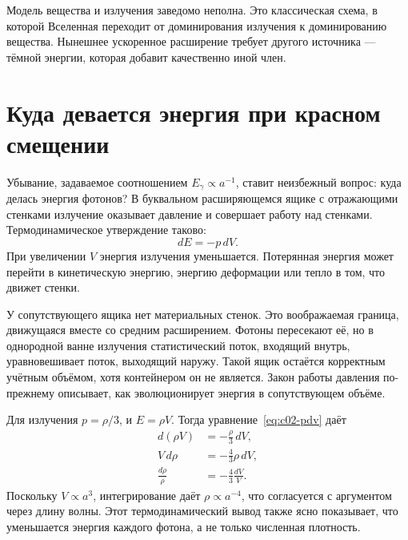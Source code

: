 Модель вещества и излучения заведомо неполна. Это классическая схема, в которой Вселенная переходит от доминирования излучения к доминированию вещества. Нынешнее ускоренное расширение требует другого источника — тёмной энергии, которая добавит качественно иной член.

\section{Куда девается энергия при красном смещении}

Убывание, задаваемое соотношением \(E_\gamma\propto a^{-1}\), ставит неизбежный вопрос: куда делась энергия фотонов? В буквальном расширяющемся ящике с отражающими стенками излучение оказывает давление и совершает работу над стенками. Термодинамическое утверждение таково:
\begin{equation}
dE=-p\,dV.
\label{eq:c02-pdv}
\end{equation}
При увеличении \(V\) энергия излучения уменьшается. Потерянная энергия может перейти в кинетическую энергию, энергию деформации или тепло в том, что движет стенки.

У сопутствующего ящика нет материальных стенок. Это воображаемая граница, движущаяся вместе со средним расширением. Фотоны пересекают её, но в однородной ванне излучения статистический поток, входящий внутрь, уравновешивает поток, выходящий наружу. Такой ящик остаётся корректным учётным объёмом, хотя контейнером он не является. Закон работы давления по-прежнему описывает, как эволюционирует энергия в сопутствующем объёме.

Для излучения \(p=\rho/3\), и \(E=\rho V\). Тогда уравнение~\eqref{eq:c02-pdv} даёт
\begin{align}
d(\rho V)&=-\frac{\rho}{3}\,dV,\\
V\,d\rho&=-\frac{4}{3}\rho\,dV,\\
\frac{d\rho}{\rho}&=-\frac{4}{3}\frac{dV}{V}.
\end{align}
Поскольку \(V\propto a^3\), интегрирование даёт \(\rho\propto a^{-4}\), что согласуется с аргументом через длину волны. Этот термодинамический вывод также ясно показывает, что уменьшается энергия каждого фотона, а не только численная плотность.

\begin{classroomqa}
\end{classroomqa}


